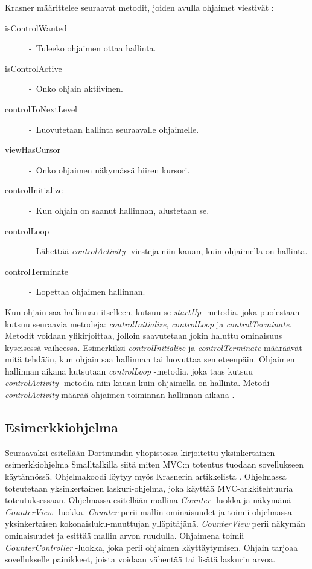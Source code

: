 \documentclass[utf8]{gradu3}
\begin{document}
Krasner määrittelee seuraavat metodit, joiden avulla ohjaimet viestivät \parencite[s. 9]{krasner_desc}:

\begin{description}
\item[isControlWanted] -\ Tuleeko ohjaimen ottaa hallinta.
\item[isControlActive] -\ Onko ohjain aktiivinen.
\item[controlToNextLevel] -\ Luovutetaan hallinta seuraavalle ohjaimelle.
\item[viewHasCursor] -\ Onko ohjaimen näkymässä hiiren kursori.
\item[controlInitialize] -\ Kun ohjain on saanut hallinnan, alustetaan se.
\item[controlLoop] -\ Lähettää \emph{controlActivity} -viesteja niin kauan, kuin ohjaimella on hallinta.
\item[controlTerminate] -\ Lopettaa ohjaimen hallinnan.
\end{description} 

Kun ohjain saa hallinnan itselleen, kutsuu se \emph{startUp} -metodia, joka puolestaan kutsuu seuraavia metodeja: \emph{controlInitialize}, \emph{controlLoop} ja \emph{controlTerminate}. Metodit
voidaan ylikirjoittaa, jolloin saavutetaan jokin haluttu ominaisuus kyseisessä vaiheessa. Esimerkiksi \emph{controlInitialize} ja \emph{controlTerminate} määräävät mitä tehdään, kun ohjain saa hallinnan tai luovuttaa sen eteenpäin. Ohjaimen hallinnan aikana kutsutaan
\emph{controlLoop} -metodia, joka taas kutsuu \emph{controlActivity} -metodia niin kauan kuin ohjaimella on hallinta.  Metodi \emph{controlActivity} määrää ohjaimen toiminnan hallinnan aikana \cite[s. 9]{krasner_desc}.

\subsection{Esimerkkiohjelma}
Seuraavaksi esitellään  Dortmundin yliopistossa kirjoitettu yksinkertainen esimerkkiohjelma Smalltalkilla siitä miten MVC:n toteutus tuodaan sovellukseen käytännössä. Ohjelmakoodi löytyy myös Krasnerin artikkelista \cite[s. 20]{krasner_desc}. Ohjelmassa toteutetaan yksinkertainen laskuri-ohjelma, joka käyttää MVC-arkkitehtuuria toteutuksessaan. Ohjelmassa esitellään mallina \emph{Counter} -luokka ja näkymänä \emph{CounterView} -luokka. \emph{Counter} perii mallin ominaisuudet ja
toimii ohjelmassa yksinkertaisen kokonaisluku-muuttujan ylläpitäjänä. \emph{CounterView} perii näkymän ominaisuudet ja esittää mallin arvon ruudulla.
Ohjaimena toimii \emph{CounterController} -luokka, joka perii ohjaimen käyttäytymisen. Ohjain tarjoaa sovellukselle painikkeet, joista voidaan vähentää
tai lisätä laskurin arvoa.
\end{document}

